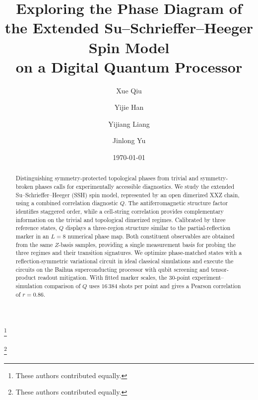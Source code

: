 \documentclass[aps,pra,reprint,groupedaddress,floatfix]{revtex4-2}
\begin{document}
\title{Exploring the Phase Diagram of the Extended Su--Schrieffer--Heeger Spin Model\\
on a Digital Quantum Processor}

\author{Xue Qiu}\thanks{These authors contributed equally.}
\author{Yijie Han}\thanks{These authors contributed equally.}
\author{Yijiang Liang}
\author{Jinlong Yu}

\date{\today}

\begin{abstract}
Distinguishing symmetry-protected topological phases from trivial and symmetry-broken phases calls for experimentally accessible diagnostics.
We study the extended Su--Schrieffer--Heeger (SSH) spin model, represented by an open dimerized XXZ chain, using a combined correlation diagnostic $Q$.
The antiferromagnetic structure factor identifies staggered order, while a cell-string correlation provides complementary information on the trivial and topological dimerized regimes.
Calibrated by three reference states, $Q$ displays a three-region structure similar to the partial-reflection marker in an $L=8$ numerical phase map.
Both constituent observables are obtained from the same $Z$-basis samples, providing a single measurement basis for probing the three regimes and their transition signatures.
We optimize phase-matched states with a reflection-symmetric variational circuit in ideal classical simulations and execute the circuits on the Baihua superconducting processor with qubit screening and tensor-product readout mitigation.
With fitted marker scales, the $30$-point experiment--simulation comparison of $Q$ uses $16\,384$ shots per point and gives a Pearson correlation of $r=0.86$.
\end{abstract}

\maketitle


\FloatBarrier

\FloatBarrier

\FloatBarrier

\FloatBarrier

\FloatBarrier

\FloatBarrier

\FloatBarrier

\FloatBarrier

\FloatBarrier


\FloatBarrier


\end{document}
